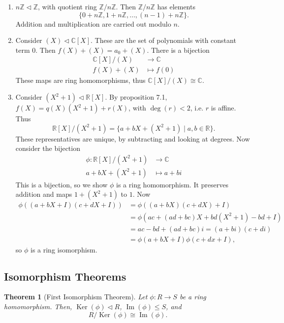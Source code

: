 \documentclass[12pt]{article}
\DeclareMathOperator{\Ker}{Ker}
\DeclareMathOperator{\Img}{Im}
\newtheorem{theorem}{Theorem}[section]
\theoremstyle{definition}
\theoremstyle{remark}
\begin{document}
\begin{enumerate}[label = (\roman*)]
	\item $n \mathbb{Z} \lhd \mathbb{Z}$, with quotient ring $\mathbb{Z} / n \mathbb{Z}$. Then $\mathbb{Z} / n \mathbb{Z}$ has elements
		\[
			\{0 + n \mathbb{Z}, 1 + n \mathbb{Z}, \ldots, (n-1) + n \mathbb{Z} \}
		.\]
		Addition and multiplication are carried out modulo $n$.
	\item Consider $(X) \lhd \mathbb{C}[X]$. These are the set of polynomials with constant term 0. Then $f(X) + (X) = a_0 + (X)$. There is a bijection
		\begin{align*}
			\mathbb{C}[X]/(X) &\to \mathbb{C} \\
			f(X) + (X) &\mapsto f(0)
		\end{align*}
		These maps are ring homomorphisms, thus $\mathbb{C}[X]/(X) \cong \mathbb{C}$.
	\item Consider $(X^2 + 1) \lhd \mathbb{R}[X]$. By proposition 7.1, $f(X) = q(X)(X^2 + 1) + r(X)$, with $\deg(r) < 2$, i.e. $r$ is affine. Thus
		\[
			\mathbb{R}[X]/(X^2 + 1) = \{a + bX + (X^2 + 1) \mid a, b \in \mathbb{R}\}
		.\]
		These representatives are unique, by subtracting and looking at degrees. Now consider the bijection
		\begin{align*}
			\phi : \mathbb{R}[X]/(X^2 + 1) &\to \mathbb{C} \\
			a + bX + (X^2 + 1) &\mapsto a + bi
		\end{align*}
		This is a bijection, so we show $\phi$ is a ring homomorphism. It preserves addition and maps $1 + (X^2 + 1)$ to $1$. Now
		\begin{align*}
			\phi((a + bX + I)(c + dX + I)) &= \phi((a + bX)(c + dX) + I) \\
						       &= \phi(ac + (ad + bc)X + bd(X^2 + 1) - bd + I) \\
			&= ac - bd + (ad + bc)i = (a + bi)(c + di) \\
			&= \phi(a + bX + I) \phi(c + dx + I),
		\end{align*}
		so $\phi$ is a ring isomorphism.
\end{enumerate}

\subsection{Isomorphism Theorems}%
\label{sub:isomorphism_theorems_rings}

\begin{theorem}[First Isomorphism Theorem]
	Let $\phi: R \to S$ be a ring homomorphism. Then, $\Ker(\phi) \lhd R$, $\Img(\phi) \leq S$, and
	\[
		R/\Ker(\phi) \cong \Img(\phi)
	.\]
\end{theorem}
\end{document}
